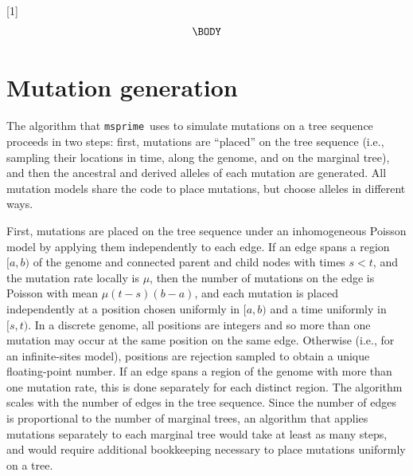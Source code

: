 \documentclass{article}
\newcommand{\msprime}[0]{\texttt{msprime}}
\begin{document}
 \newcommand{\be}{\begin{equation}}
 \newcommand{\ee}{\end{equation}}
 \newcommand{\bd}{\begin{displaymath}}
 \newcommand{\ed}{\end{displaymath}}
\newcommand{\IN}{\ensuremath{\mathds{N}}}%
\newcommand{\EE}[1]{\ensuremath{\mathds{E}\left[ #1 \right]}}%
\newcommand{\one}[1]{\ensuremath{\mathds{1}_{\left\{ #1 \right\}}}}%
\newcommand{\prb}[1]{\ensuremath{\mathds{P}\left( #1 \right) } }%

[1]{%
\begin{equation}
\label{#1}
\begin{split}
  \BODY
\end{split}\end{equation}
}

\setcounter{secnumdepth}{2} %

\appendix

\section*{Mutation generation}
\label{app-mutation-algorithm}

The algorithm that \msprime\ uses to simulate mutations on a tree sequence
proceeds in two steps:
first, mutations are ``placed'' on the tree sequence
(i.e., sampling their locations in time, along the genome, and on the marginal tree),
and then the ancestral and derived alleles of each mutation are generated.
All mutation models share the code to place mutations,
but choose alleles in different ways.

First, mutations are placed on the tree sequence under an inhomogeneous Poisson model
by applying them independently to each edge.
If an edge spans a region $[a, b)$ of the genome
and connected parent and child nodes with times $s < t$,
and the mutation rate locally is $\mu$,
then the number of mutations on the edge is Poisson with mean $\mu (t-s) (b-a)$,
and each mutation is placed independently at a position chosen uniformly in $[a,b)$
and a time uniformly in $[s,t)$.
In a discrete genome, all positions are integers and so more than one mutation
may occur at the same position on the same edge.
Otherwise (i.e., for an infinite-sites model),
positions are rejection sampled to obtain a unique floating-point number.
If an edge spans a region of the genome with more than one mutation rate,
this is done separately for each distinct region.
The algorithm scales with the number of edges in the tree sequence.
Since the number of edges is proportional to the number of marginal trees,
an algorithm that applies mutations separately to each marginal tree
would take at least as many steps,
and would require additional bookkeeping necessary to place mutations uniformly on a tree.
\end{document}
